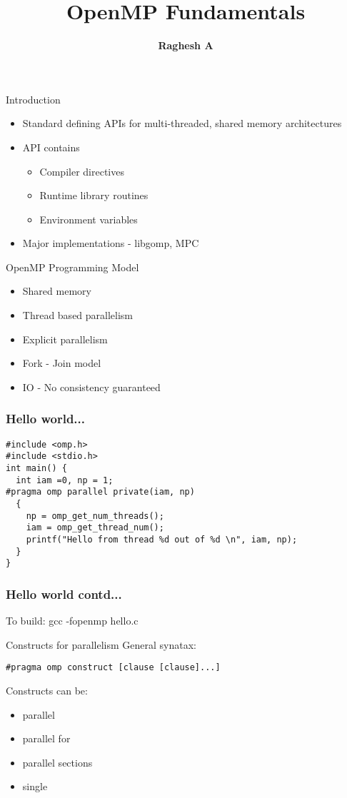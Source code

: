 \documentclass[14pt]{beamer}
\title{OpenMP Fundamentals}
\author{\textbf{Raghesh A}}
\date
\begin{document}
\begin{frame}
\titlepage
\end{frame}

\begin{frame}{Introduction}
\begin{itemize}
\item Standard defining APIs for multi-threaded, shared memory architectures
\item API contains
  \begin{itemize}
  \item Compiler directives
  \item Runtime library routines
  \item Environment variables
  \end{itemize}
\item Major implementations - libgomp, MPC
\end{itemize}
\end{frame}

\begin{frame}{OpenMP Programming Model}
\begin{itemize}
\item Shared memory
\item Thread based parallelism
\item Explicit parallelism
\item Fork - Join model
\item IO - No consistency guaranteed
\end{itemize}
\end{frame}

\begin{frame}[fragile]
\frametitle{Hello world...}
\begin{Verbatim}
#include <omp.h>
#include <stdio.h>
int main() {        
  int iam =0, np = 1;
#pragma omp parallel private(iam, np)
  {
    np = omp_get_num_threads();
    iam = omp_get_thread_num();
    printf("Hello from thread %d out of %d \n", iam, np);
  }
}
\end{Verbatim}
\end{frame}

\begin{frame}[fragile]
\frametitle{Hello world contd...}
\begin{block}
{To build: gcc -fopenmp hello.c}
\end{block}
\end{frame}

\begin{frame}[fragile]{Constructs for parallelism}
General synatax:
\begin{Verbatim}
#pragma omp construct [clause [clause]...]
\end{Verbatim}
Constructs can be:
\begin{itemize}
\item parallel
\item parallel for
\item parallel sections
\item single
\end{itemize}
\end{frame}
\end{document}
